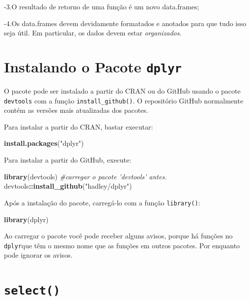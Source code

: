 \documentclass[]{book}
\newenvironment{Shaded}{\begin{snugshade}}{\end{snugshade}}
\newcommand{\CommentTok}[1]{\textcolor[rgb]{0.56,0.35,0.01}{\textit{#1}}}
\newcommand{\KeywordTok}[1]{\textcolor[rgb]{0.13,0.29,0.53}{\textbf{#1}}}
\newcommand{\NormalTok}[1]{#1}
\newcommand{\OperatorTok}[1]{\textcolor[rgb]{0.81,0.36,0.00}{\textbf{#1}}}
\newcommand{\StringTok}[1]{\textcolor[rgb]{0.31,0.60,0.02}{#1}}
\begin{document}
-3.O resultado de retorno de uma função é um novo data.frames;

-4.Os data.frames devem devidamente formatados e anotados para que tudo isso seja útil. Em particular, os dados devem estar \emph{organizados}.

\hypertarget{instalando-o-pacote-dplyr}{%
\section{\texorpdfstring{Instalando o Pacote \texttt{dplyr}}{Instalando o Pacote dplyr}}\label{instalando-o-pacote-dplyr}}

O pacote pode ser instalado a partir do CRAN ou do GitHub usando o pacote \texttt{devtools} com a função \texttt{install\_github()}. O repositório GitHub normalmente contém as versões mais atualizadas dos pacotes.

Para instalar a partir do CRAN, bastar executar:

\begin{Shaded}
\begin{Highlighting}[]
\KeywordTok{install.packages}\NormalTok{(}\StringTok{"dplyr"}\NormalTok{)}
\end{Highlighting}
\end{Shaded}

Para instalar a partir do GitHub, execute:

\begin{Shaded}
\begin{Highlighting}[]
\KeywordTok{library}\NormalTok{(devtools) }\CommentTok{#carregar o pacote 'devtools' antes.}
\NormalTok{devtools}\OperatorTok{::}\KeywordTok{install_github}\NormalTok{(}\StringTok{"hadley/dplyr"}\NormalTok{)}
\end{Highlighting}
\end{Shaded}

Após a instalação do pacote, carregá-lo com a função \texttt{library()}:

\begin{Shaded}
\begin{Highlighting}[]
\KeywordTok{library}\NormalTok{(dplyr)}
\end{Highlighting}
\end{Shaded}

Ao carregar o pacote você pode receber alguns avisos, porque há funções no \texttt{dplyr}que têm o mesmo nome que as funções em outros pacotes. Por enquanto pode ignorar os avisos.

\hypertarget{select}{%
\section{\texorpdfstring{\texttt{select()}}{select()}}\label{select}}
\end{document}

